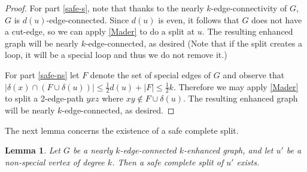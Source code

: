 \documentclass[letterpaper,11pt]{article}
\newtheorem{lemma}[theorem]{Lemma}
\theoremstyle{definition}
\begin{document}
\begin{proof}
	For part \ref{safe-s}, note that thanks to the nearly $k$-edge-connectivity of $G$, $G$ is $d(u)$-edge-connected. Since $d(u)$ is even, it follows that $G$ does not have a cut-edge, so we can apply \cref{Mader} to do a split at $u$.  The resulting enhanced graph will be nearly $k$-edge-connected, as desired (Note that if the split creates a loop, it will be a special loop and thus we do not remove it.)   
	
	For part \ref{safe-ns}  let $F$ denote the set of special edges of $G$ and observe that $| \delta(x) \cap (F \cup \delta(u))| \le \frac{1}{2} d(u) + |F| \le \frac{1}{2}k$.  Therefore we may apply \cref{Mader} to split a 2-edge-path $yxz$ where $xy \not\in F \cup \delta(u)$.  The resulting enhanced graph will be nearly $k$-edge-connected, as desired.
\end{proof}



The next lemma concerns the existence of a safe complete split.



\begin{lemma}
	\label{safe-comp-sp}
	Let $G$ be a nearly $k$-edge-connected $k$-enhanced graph, and let $u'$ be a non-special vertex of degree $k$. Then a safe complete split of $u'$ exists.
\end{lemma}
\end{document}
